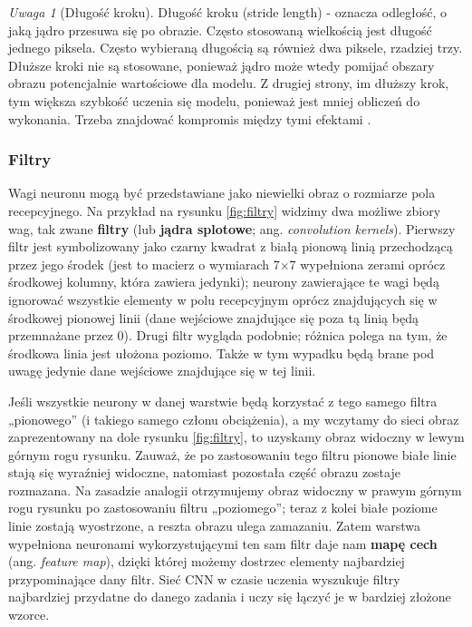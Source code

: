 \documentclass[12pt]{mwbk}
\theoremstyle{plain}
\theoremstyle{definition}
\theoremstyle{remark}
\newtheorem{uwaga}{Uwaga}[chapter]
\begin{document}
\begin{uwaga}[Długość kroku]
	Długość kroku (stride length) - oznacza odległość, o jaką jądro przesuwa się po obrazie. Często stosowaną wielkością jest długość jednego piksela. Często wybieraną długością są również dwa piksele, rzadziej trzy. Dłuższe kroki nie są stosowane, ponieważ jądro może wtedy pomijać obszary obrazu potencjalnie wartościowe dla modelu. Z drugiej strony, im dłuższy krok, tym większa szybkość uczenia się modelu, ponieważ jest mniej obliczeń do wykonania. Trzeba znajdować kompromis między tymi efektami \cite{illustrated}.
\end{uwaga}

\subsubsection{Filtry}

Wagi neuronu mogą być przedstawiane jako niewielki obraz o rozmiarze pola recepcyjnego. Na
przykład na rysunku \ref{fig:filtry} widzimy dwa możliwe zbiory wag, tak zwane \textbf{filtry} (lub \textbf{jądra splotowe}; ang. \emph{convolution kernels}). Pierwszy filtr jest symbolizowany jako czarny kwadrat z białą pionową
linią przechodzącą przez jego środek (jest to macierz o wymiarach 7×7 wypełniona zerami oprócz
środkowej kolumny, która zawiera jedynki); neurony zawierające te wagi będą ignorować wszystkie
elementy w polu recepcyjnym oprócz znajdujących się w środkowej pionowej linii (dane wejściowe
znajdujące się poza tą linią będą przemnażane przez 0). Drugi filtr wygląda podobnie; różnica
polega na tym, że środkowa linia jest ułożona poziomo. Także w tym wypadku będą brane pod uwagę
jedynie dane wejściowe znajdujące się w tej linii.

Jeśli wszystkie neurony w danej warstwie będą korzystać z tego samego filtra „pionowego” (i takiego
samego członu obciążenia), a my wczytamy do sieci obraz zaprezentowany na dole rysunku \ref{fig:filtry},
to uzyskamy obraz widoczny w lewym górnym rogu rysunku. Zauważ, że po zastosowaniu tego filtru
pionowe białe linie stają się wyraźniej widoczne, natomiast pozostała część obrazu zostaje rozmazana.
Na zasadzie analogii otrzymujemy obraz widoczny w prawym górnym rogu rysunku po zastosowaniu filtru „poziomego”; teraz z kolei białe poziome linie zostają wyostrzone, a reszta obrazu ulega zamazaniu. Zatem warstwa wypełniona neuronami wykorzystującymi ten sam filtr daje nam \textbf{mapę cech} (ang. \emph{feature map}), dzięki której możemy dostrzec elementy najbardziej przypominające dany filtr. Sieć CNN w czasie uczenia wyszukuje filtry najbardziej przydatne do danego zadania i uczy się łączyć je w bardziej złożone wzorce.
\end{document}
